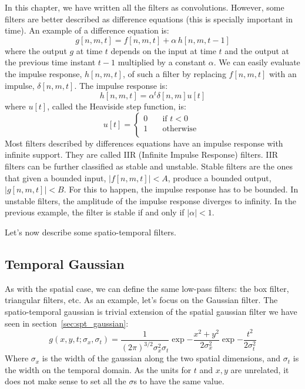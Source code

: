 In this chapter, we have written all the filters as convolutions. However, some filters are better described as difference equations (this is specially important in time). An example of a difference equation is:
\begin{equation}
g \left[n,m,t \right] = f \left[n,m,t \right] + \alpha \, h \left[n,m,t-1 \right]
\end{equation}
where the output $g$ at time $t$ depends on the input at time $t$ and the output at the previous time instant $t-1$ multiplied by a constant $\alpha$. We can easily evaluate the impulse response, $h \left[n,m,t \right]$, of such a filter by replacing $f\left[n,m,t \right]$ with an impulse, $\delta \left[n,m,t \right]$. The impulse response is:
\begin{equation}
h \left[n,m,t \right] = \alpha^t  \delta \left[n,m \right] u \left[t \right]
\end{equation}
where $u\left[t \right]$, called the Heaviside step function, is:
\begin{equation}
u \left[t \right] = \begin{cases}
    0     & \quad \text{if }  t <0 \\
    1     & \quad \text{otherwise }\\
\end{cases}
\end{equation}
Most filters described by differences equations have an impulse response with infinite support. They are called IIR (Infinite Impulse Response) filters. IIR filters can be further classified as stable and unstable. Stable filters are the ones that given a bounded input, $| f \left[n,m,t \right] |<A$, produce a bounded output, $| g \left[n,m,t \right] | <B$. For this to happen, the impulse response has to be bounded. In unstable filters, the amplitude of the impulse response diverges to infinity. In the previous example, the filter is stable if and only if $| \alpha | < 1$. 

Let's now describe some spatio-temporal filters. 


\subsection{Temporal Gaussian}

As with the spatial case, we can define the same low-pass filters: the box filter, triangular filters, etc.  As an example, let's focus on the Gaussian filter. The spatio-temporal gaussian is trivial extension of the spatial gaussian filter we have seen in section~\ref{sec:spt_gaussian}:
\begin{equation}
g(x,y,t; \sigma_x,\sigma_t) = \frac{1}{(2 \pi)^{3/2} \sigma_x^2\sigma_t} \exp{-\frac{x^2 +
   y^2}{2 \sigma_x^2}} \exp{-\frac{t^2}{2 \sigma_t^2}}
\label{eq:gauss3dcont}
\end{equation}
Where $\sigma_x$ is the width of the gaussian along the two spatial dimensions, and $\sigma_t$ is the width on the temporal domain. As the units for $t$ and $x,y$ are unrelated, it does not make sense to set all the $\sigma$s to have the same value. 

